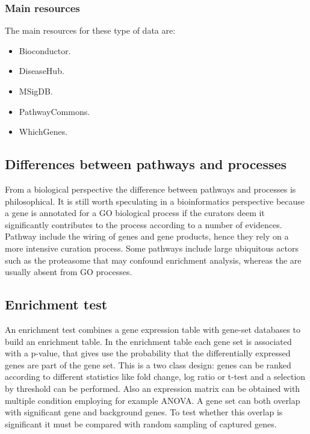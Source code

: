 		\subsubsection{Main resources}
		The main resources for these type of data are:

		\begin{multicols}{2}
			\begin{itemize}
				\item Bioconductor.
				\item DiseaseHub.
				\item MSigDB.
				\item PathwayCommons.
				\item WhichGenes.
			\end{itemize}
		\end{multicols}

	\subsection{Differences between pathways and processes}
	From a biological perspective the difference between pathways and processes is philosophical.
	It is still worth speculating in a bioinformatics perspective because a gene is annotated for a GO biological process if the curators deem it significantly contributes to the process according to a number of evidences.
	Pathway include the wiring of genes and gene products, hence they rely on a more intensive curation process.
	Some pathways include large ubiquitous actors such as the proteasome that may confound enrichment analysis, whereas the are usually absent from GO processes.

	\subsection{Enrichment test}
	An enrichment test combines a gene expression table with gene-set databases to build an enrichment table.
	In the enrichment table each gene set is associated with a p-value, that gives use the probability that the differentially expressed genes are part of the gene set.
	This is a two class design: genes can be ranked according to different statistics like fold change, log ratio or t-test and a selection by threshold can be performed.
	Also an expression matrix can be obtained with multiple condition employing for example ANOVA.
	A gene set can both overlap with significant gene and background genes.
	To test whether this overlap is significant it must be compared with random sampling of captured genes.

